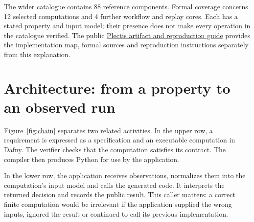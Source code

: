 \documentclass[11pt]{article}
\newcommand{\repourl}{https://github.com/wcook04/practical-formal-verification}
\newcommand{\artifactguide}{\href{\repourl/blob/main/paper/README.md}{Plectis artifact and reproduction guide}}
\newcommand{\formalcomponentcount}{12}
\newcommand{\workflowcorecount}{4}
\begin{document}
The wider catalogue contains 88 reference components. Formal coverage concerns
\formalcomponentcount{} selected computations and \workflowcorecount{} further
workflow and replay cores. Each has a stated property and input model; their
presence does not make every operation in the catalogue verified. The public
\artifactguide{} provides the implementation map, formal sources and
reproduction instructions separately from this explanation.

\section{Architecture: from a property to an observed run}
\label{sec:architecture}
Figure~\ref{fig:chain} separates two related activities. In the upper row, a
requirement is expressed as a specification and an executable computation in
Dafny. The verifier checks that the computation satisfies its contract. The
compiler then produces Python for use by the application.

In the lower row, the application receives observations, normalizes them into
the computation's input model and calls the generated code. It interprets the
returned decision and records the public result. This caller matters: a correct
finite computation would be irrelevant if the application supplied the wrong
inputs, ignored the result or continued to call its previous implementation.
\end{document}
